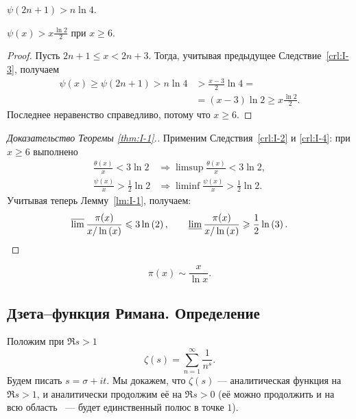 \begin{ncorollary}
\label{crl:I-3}
    $\psi(2n + 1) > n\ln{4}$.
\end{ncorollary}

\begin{ncorollary}
\label{crl:I-4}
    $\psi(x) > x \frac{\ln{2}}{2}$ при $x \ge 6$.
\end{ncorollary}
\begin{proof}
    Пусть $2n + 1 \le x < 2n + 3$. Тогда, учитывая предыдущее Следствие~\ref{crl:I-3}, получаем
    \begin{align*}
        \psi(x) \ge \psi(2n+1) > n \ln{4} &> \frac{x - 3}{2} \ln{4} = \\
        & = (x-3) \ln{2} \ge x \frac{\ln{2}}{2}.
    \end{align*}
    Последнее неравенство справедливо, потому что $x \ge 6$.
\end{proof}

\begin{proof}[Доказательство Теоремы \ref{thm:I-1}.]
    Применим Следствия~\ref{crl:I-2} и \ref{crl:I-4}: при $x \ge 6$ выполнено
    \begin{align*}
        \frac{\theta(x)}{x} < 3\ln{2} &\Rightarrow \limsup{\frac{\theta(x)}{x}} < 3\ln{2}, \\
        \frac{\psi(x)}{x} > \frac{1}{2}\ln{2} &\Rightarrow \liminf{\frac{\psi(x)}{x}} > \frac{1}{2}\ln{2}. 
    \end{align*}
    Учитывая теперь Лемму~\ref{lm:I-1}, получаем:
    \[
        \varlimsup{\frac{\pi(x)}{\ensuremath{x / \operatorname{ln}\left( x \right)}}} \leqslant 3\operatorname{ln}\left( 2 \right),
        \qquad
        \varliminf{\frac{\pi(x)}{\ensuremath{x / \operatorname{ln}\left( x \right)}}} \geqslant \frac{1}{2}\operatorname{ln}\left( 3 \right).
    \]
\end{proof}

\begin{theorem}
    \[
        \pi(x) \sim \frac{x}{\ln{x}}.
    \]
\end{theorem}


\subsection{Дзета--функция Римана. Определение}
\label{subsec:I-2}

\begin{ndefinition}
\label{I_Riemann-zeta-function}
    Положим при $\Re{s} > 1$
    \[
        \zeta(s) = \sum_{n=1}^\infty \frac{1}{n^s}.
    \]
    Будем писать $s = \sigma + it$. Мы докажем, что $\zeta(s)$ --- аналитическая функция на ${\Re{s} > 1}$, и аналитически продолжим её на $\Re{s} > 0$ (её можно продолжить и на всю область \CC~--- будет единственный полюс в точке $1$).
\end{ndefinition}

